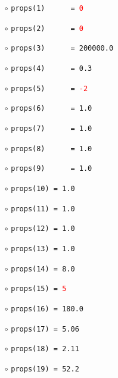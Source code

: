 \documentclass[11pt,a4paper,twoside,final,onecolumn,titlepage]{article}
\begin{document}
\noindent
\begin{minipage}{0.4\textwidth}
	\begin{itemize}
		\item[]
		\item[$\circ$] \texttt{props(1)\,\,\,\,\,\,= \textcolor{red}{0}}
		\item[$\circ$] \texttt{props(2)\,\,\,\,\,\,= \textcolor{red}{0}}
		\item[$\circ$] \texttt{props(3)\,\,\,\,\,\,= 200000.0}
		\item[$\circ$] \texttt{props(4)\,\,\,\,\,\,= 0.3}
		\item[$\circ$] \texttt{props(5)\,\,\,\,\,\,= \textcolor{red}{-2}}
		\item[$\circ$] \texttt{props(6)\,\,\,\,\,\,= 1.0}
		\item[$\circ$] \texttt{props(7)\,\,\,\,\,\,= 1.0}
		\item[$\circ$] \texttt{props(8)\,\,\,\,\,\,= 1.0}
		\item[$\circ$] \texttt{props(9)\,\,\,\,\,\,= 1.0}
		\item[$\circ$] \texttt{props(10) = 1.0}
		\item[$\circ$] \texttt{props(11) = 1.0}
		\item[$\circ$] \texttt{props(12) = 1.0}
		\item[$\circ$] \texttt{props(13) = 1.0}
		\item[$\circ$] \texttt{props(14) = 8.0}
		\item[$\circ$] \texttt{props(15) = \textcolor{red}{5}}
		\item[$\circ$] \texttt{props(16) = 180.0}
		\item[$\circ$] \texttt{props(17) = 5.06}
		\item[$\circ$] \texttt{props(18) = 2.11}
		\item[$\circ$] \texttt{props(19) = 52.2}
	\end{itemize} 
\end{minipage}
\end{document}
